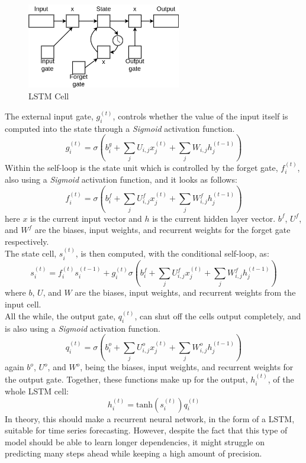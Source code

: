 \documentclass[main.tex]{subfiles}
\begin{document}
\begin{figure}[H]
\centering
\includegraphics[width=0.6\textwidth]{Figures/LSTMCell.png}
\caption{LSTM Cell}
\label{fig:LSTM Cell}
\end{figure}

The external input gate, $g_i^{(t)}$, controls whether the value of the input itself is computed into the state through a \textit{Sigmoid} activation function. 
$$g_i^{(t)} = \sigma (b_i^g + \sum_j U_{i,j}x_j^{(t)} + \sum_j W_{i,j}h_j^{(t-1)})$$
Within the self-loop is the state unit which is controlled by the forget gate, $f_i^{(t)}$, also using a \textit{Sigmoid} activation function, and it looks as follows:
$$f_i^{(t)} = \sigma (b_i^f + \sum_j U^f_{i,j}x_j^{(t)} + \sum_j W^f_{i,j}h_j^{(t-1)})$$
here \textit{$x$} is the current input vector and \textit{$h$} is the current hidden layer vector. $b^f$, $U^f$, and $W^f$ are the biases, input weights, and recurrent weights for the forget gate respectively.\\
The state cell, $s_i^{(t)}$, is then computed, with the conditional self-loop, as:
$$s_i^{(t)} = f_i^{(t)}s_i^{(t-1)} + g_i^{(t)} \sigma (b_i^f + \sum_j U^f_{i,j}x_j^{(t)} + \sum_j W^f_{i,j}h_j^{(t-1)})$$
where \textit{$b$}, \textit{$U$}, and \textit{$W$} are the biases, input weights, and recurrent weights from the input cell.\\
All the while, the output gate, $q_i^{(t)}$, can shut off the cells output completely, and is also using a \textit{Sigmoid} activation function.
$$q_i^{(t)} =  \sigma (b_i^o + \sum_j U^o_{i,j}x_j^{(t)} + \sum_j W^o_{i,j}h_j^{(t-1)})$$
again $b^o$, $U^o$, and $W^o$, being the biases, input weights, and recurrent weights for the output gate.
Together, these functions make up for the output, $h_i^{(t)}$, of the whole LSTM cell:
$$h_i^{(t)} = \text{tanh}(s_i^{(t)})q_i^{(t)}$$
In theory, this should make a recurrent neural network, in the form of a LSTM, suitable for time series forecasting. However, despite the fact that this type of model should be able to learn longer dependencies, it might struggle on predicting many steps ahead while keeping a high amount of precision.
\end{document}
